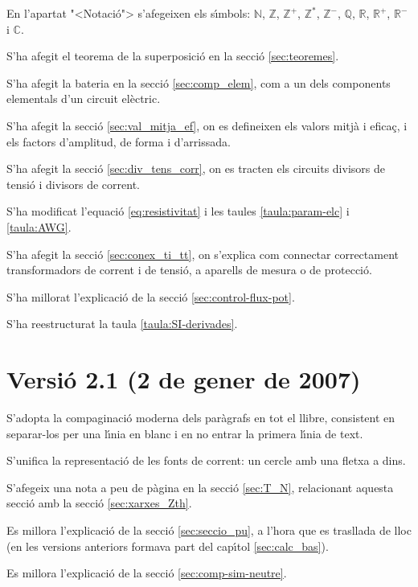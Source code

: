 En l'apartat {"<}Notaci\'{o}{">} s'afegeixen els s\'{\i}mbols: $\mathbb{N}$,
$\mathbb{Z}$, $\mathbb{Z}^+$,  $\mathbb{Z}^*$, $\mathbb{Z}^-$,
$\mathbb{Q}$, $\mathbb{R}$, $\mathbb{R}^+$, $\mathbb{R}^-$ i
$\mathbb{C}$.

S'ha afegit el teorema de la superposici\'{o} en la secci\'{o}
\ref{sec:teoremes}.


S'ha afegit la bateria en la secci\'{o} \ref{sec:comp_elem}, com a un
dels components elementals d'un circuit el\`{e}ctric.

S'ha afegit la secci\'{o} \ref{sec:val_mitja_ef}, on es defineixen els
valors mitj\`{a} i efica\c{c}, i els factors d'amplitud, de forma i
d'arrissada.

S'ha afegit la secci\'{o} \ref{sec:div_tens_corr}, on es tracten els
circuits divisors de tensi\'{o} i divisors de corrent.

 S'ha modificat l'equaci\'{o} \eqref{eq:resistivitat}
i les taules \ref{taula:param-elc} i \ref{taula:AWG}.

S'ha afegit la secci\'{o} \ref{sec:conex_ti_tt}, on s'explica com
connectar correctament transformadors de corrent i de tensi\'{o}, a
aparells de mesura o de protecci\'{o}.

S'ha millorat l'explicaci\'{o} de la secci\'{o} \ref{sec:control-flux-pot}.

S'ha reestructurat la taula \ref{taula:SI-derivades}.

\section*{Versi\'{o} 2.1 (2 de gener de 2007)}

S'adopta la compaginaci\'{o} moderna dels par\`{a}grafs en tot el llibre, consistent en separar-los per una l\'{\i}nia en blanc i en no entrar la primera l\'{\i}nia de text.

S'unifica la representaci\'{o} de les fonts de corrent: un cercle amb una fletxa a dins.

S'afegeix una nota a peu de p\`{a}gina en la secci\'{o} \ref{sec:T_N}, relacionant aquesta secci\'{o} amb la secci\'{o} \ref{sec:xarxes_Zth}.

Es millora l'explicaci\'{o} de la secci\'{o} \ref{sec:seccio_pu}, a l'hora que es trasllada de lloc (en les versions anteriors formava part del cap\'{\i}tol \ref{sec:calc_bas}).

Es millora l'explicaci\'{o} de la secci\'{o} \ref{sec:comp-sim-neutre}.

